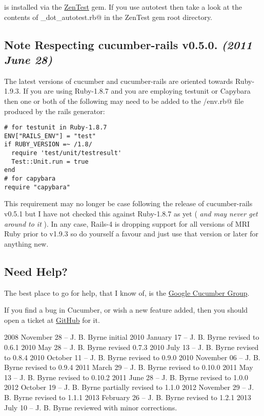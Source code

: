 \verb@autotest@ is installed via the \href{http://www.zenspider.com/ZSS/Products/ZenTest/}{ZenTest} gem.  If you use autotest then take a look at the contents of \verb@example_dot_autotest.rb@ in the ZenTest gem root directory.

\subsection{Note Respecting cucumber-rails v0.5.0. \emph{(2011 June 28)}}

The latest versions of cucumber and cucumber-rails are oriented towards Ruby-1.9.3.  If you are using Ruby-1.8.7 and you are employing testunit or Capybara then one or both of the following may need to be added to the \verb@support/env.rb@ file produced by the rails generator:
\begin{verbatim}
# for testunit in Ruby-1.8.7
ENV["RAILS_ENV"] = "test"
if RUBY_VERSION =~ /1.8/
  require 'test/unit/testresult'
  Test::Unit.run = true
end
# for capybara
require "capybara"

\end{verbatim}

This requirement may no longer be case following the release of cucumber-rails v0.5.1 but I have not checked this against Ruby-1.8.7 as yet ( \emph{and may never get around to it} ).  In any case, Rails-4 is dropping support for all versions of MRI Ruby prior to v1.9.3 so do yourself a favour and just use that version or later for anything new.

\subsection{Need Help?}

The best place to go for help, that I know of, is the \href{http://groups.google.com/group/cukes}{Google Cucumber Group}.

If you find a bug in Cucumber, or wish a new feature added, then you should open a ticket at \href{https://github.com/cucumber/cucumber/issues}{GitHub} for it.

2008 November 28 -- J. B. Byrne initial
2010 January 17 -- J. B. Byrne revised to 0.6.1
2010 May 28 -- J. B. Byrne revised 0.7.3
2010 July 13 -- J. B. Byrne revised to 0.8.4
2010 October 11 -- J. B. Byrne revised to 0.9.0
2010 November 06 -- J. B. Byrne revised to 0.9.4
2011 March 29 -- J. B. Byrne revised to 0.10.0
2011 May 13 -- J. B. Byrne revised to 0.10.2
2011 June 28 -- J. B. Byrne revised to 1.0.0
2012 October 19 -- J. B. Byrne partially revised to 1.1.0
2012 November 29 -- J. B. Byrne revised to 1.1.1
2013 February 26 -- J. B. Byrne revised to 1.2.1
2013 July 10 -- J. B. Byrne reviewed with minor corrections.

